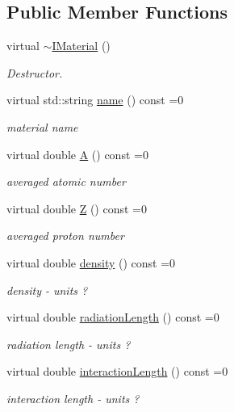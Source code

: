 \subsection*{Public Member Functions}
\begin{DoxyCompactItemize}
\item 
virtual \hyperlink{class_d_d_surfaces_1_1_i_material_ac285cbca4d2083eefe1265970e671583}{$\sim$\+I\+Material} ()
\begin{DoxyCompactList}\small\item\em Destructor. \end{DoxyCompactList}\item 
virtual std\+::string \hyperlink{class_d_d_surfaces_1_1_i_material_a2ae91470bda1952ae8dbcef59d655540}{name} () const =0
\begin{DoxyCompactList}\small\item\em material name \end{DoxyCompactList}\item 
virtual double \hyperlink{class_d_d_surfaces_1_1_i_material_a02f156030abe09aa3ebe9a4c99b059b2}{A} () const =0
\begin{DoxyCompactList}\small\item\em averaged atomic number \end{DoxyCompactList}\item 
virtual double \hyperlink{class_d_d_surfaces_1_1_i_material_a3e5d3e85db97ff9edb25a073109a14b0}{Z} () const =0
\begin{DoxyCompactList}\small\item\em averaged proton number \end{DoxyCompactList}\item 
virtual double \hyperlink{class_d_d_surfaces_1_1_i_material_ac856b9cd5ade3e0ee2720c95af766d25}{density} () const =0
\begin{DoxyCompactList}\small\item\em density -\/ units ? \end{DoxyCompactList}\item 
virtual double \hyperlink{class_d_d_surfaces_1_1_i_material_a30bf2290a5f4616d6f0ad5bd2e500300}{radiation\+Length} () const =0
\begin{DoxyCompactList}\small\item\em radiation length -\/ units ? \end{DoxyCompactList}\item 
virtual double \hyperlink{class_d_d_surfaces_1_1_i_material_a9217c1bc6b4c5562893c4249967cf64d}{interaction\+Length} () const =0
\begin{DoxyCompactList}\small\item\em interaction length -\/ units ? \end{DoxyCompactList}\end{DoxyCompactItemize}
